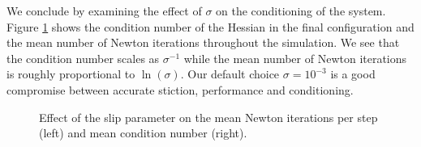 We conclude by examining the effect of $\sigma$ on the conditioning of the
system. Figure \ref{fig:clutter_sigma} shows the condition number of the Hessian
in the final configuration and the mean number of Newton iterations throughout
the simulation. We see that the condition number scales as $\sigma^{-1}$ while
the mean number of Newton iterations is roughly proportional to  $\ln(\sigma)$.
Our default choice $\sigma=10^{-3}$ is a good compromise between accurate stiction, performance and conditioning.
\begin{figure}[!h]
	\centering
	\caption{\label{fig:clutter_sigma} 
	Effect of the slip parameter on the mean Newton iterations per step (left) and mean condition number (right).}
\end{figure}
